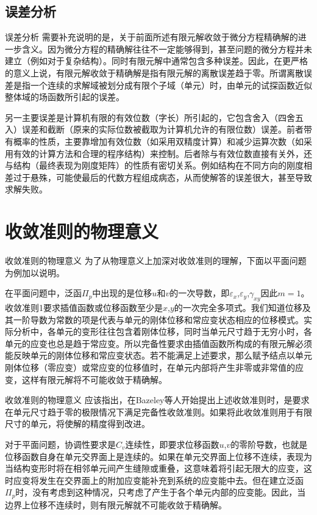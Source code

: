 \documentclass[11pt]{beamer}
\begin{document}
\subsection{误差分析}
\begin{frame}{误差分析}
需要补充说明的是，关于前面所述有限元解收敛于微分方程精确解的进一步含义。因为微分方程的精确解往往不一定能够得到，甚至问题的微分方程并未建立（例如对于复杂结构）。同时有限元解中通常包含多种误差。因此，在更严格的意义上说，有限元解收敛于精确解是指有限元解的离散误差趋于零。所谓离散误差是指一个连续的求解域被划分成有限个子域（单元）时，由单元的试探函数近似整体域的场函数所引起的误差。
\par
另一主要误差是计算机有限的有效位数（字长）所引起的，它包含舍入（四舍五入）误差和截断（原来的实际位数被截取为计算机允许的有限位数）误差。前者带有概率的性质，主要靠增加有效位数（如采用双精度计算）和减少运算次数（如采用有效的计算方法和合理的程序结构）来控制。后者除与有效位数直接有关外，还与结构（最终表现为刚度矩阵）的性质有密切关系。例如结构在不同方向的刚度相差过于悬殊，可能使最后的代数方程组成病态，从而使解答的误差很大，甚至导致求解失败。
\end{frame}

\section{收敛准则的物理意义}
\begin{frame}{收敛准则的物理意义}
为了从物理意义上加深对收敛准则的理解，下面以平面问题为例加以说明。
\par
在平面问题中，泛函$\Pi_{p}$中出现的是位移$u$和$v$的一次导数，即$\varepsilon_{x}$,$\varepsilon_{y}$,$\gamma_{xy}$因此$m=1$。收敛准则1要求插值函数或位移函数至少是$x$,$y$的一次完全多项式。我们知道位移及其一阶导数为常数的项是代表与单元的刚体位移和常应变状态相应的位移模式。实际分析中，各单元的变形往往包含着刚体位移，同时当单元尺寸趋于无穷小时，各单元的应变也总是趋于常应变。所以完备性要求由插值函数所构成的有限元解必须能反映单元的刚体位移和常应变状态。若不能满足上述要求，那么赋予结点以单元刚体位移（零应变）或常应变的位移值时，在单元内部将产生非零或非常值的应变，这样有限元解将不可能收敛于精确解。
\end{frame}

\begin{frame}{收敛准则的物理意义}
应该指出，在Bazeley等人开始提出上述收敛准则时，是要求在单元尺寸趋于零的极限情况下满足完备性收敛准则。如果将此收敛准则用于有限尺寸的单元，将使解的精度得到改进。
\par
对于平面问题，协调性要求是$C_{v}$连续性，即要求位移函数$u$,$v$的零阶导数，也就是位移函数自身在单元交界面上是连续的。如果在单元交界面上位移不连续，表现为当结构变形时将在相邻单元间产生缝隙或重叠，这意味着将引起无限大的应变，这时应变将发生在交界面上的附加应变能补充到系统的应变能中去。但在建立泛函$\Pi_{p}$时，没有考虑到这种情况，只考虑了产生于各个单元内部的应变能。因此，当边界上位移不连续时，则有限元解就不可能收敛于精确解。
\end{frame}
\end{document}
